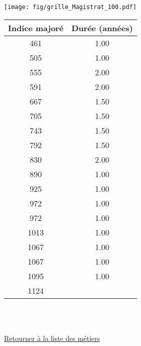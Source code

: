 \begin{minipage}{0.55\linewidth}\texttt{[image: fig/grille\_Magistrat\_100.pdf]}\end{minipage} 
\begin{minipage}{0.3\linewidth} 
 \begin{center} 

\begin{tabular}[htb]{|c|c|} 
\hline 
 Indice majoré &  Durée (années) \\ 
\hline \hline 
 461 &  1.00 \\ 
\hline 
 505 &  1.00 \\ 
\hline 
 555 &  2.00 \\ 
\hline 
 591 &  2.00 \\ 
\hline 
 667 &  1.50 \\ 
\hline 
 705 &  1.50 \\ 
\hline 
 743 &  1.50 \\ 
\hline 
 792 &  1.50 \\ 
\hline 
 830 &  2.00 \\ 
\hline 
 890 &  1.00 \\ 
\hline 
 925 &  1.00 \\ 
\hline 
 972 &  1.00 \\ 
\hline 
 972 &  1.00 \\ 
\hline 
 1013 &  1.00 \\ 
\hline 
 1067 &  1.00 \\ 
\hline 
 1067 &  1.00 \\ 
\hline 
 1095 &  1.00 \\ 
\hline 
 1124 &   \\ 
\hline 
\hline 
\end{tabular} 
\end{center} 
 \end{minipage} 

~\\ 
 


   
 \localtableofcontents 

~\\ 
 
 \hyperlink{page.2}{\noindent Retourner à la liste des métiers}

